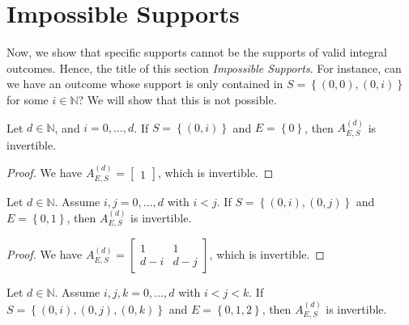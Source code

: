 \section{Impossible Supports}\label{sec:impossible-supports}

Now, we show that specific supports cannot be the supports of valid integral outcomes. Hence, the title of this section \emph{Impossible Supports}. For instance, can we have an outcome whose support is only contained in \( S = \left\{ (0,0), (0,i) \right\} \) for some \( i \in \mathbb{N} \)? We will show that this is not possible.



\begin{proposition}\label{prop:impossible-support-23233243243423}
    Let \( d \in \mathbb{N} \), and \( i=0, \dots, d \). If \( S = \left\{ (0,i) \right\} \) and \( E = \left\{ 0 \right\} \), then \( A^{(d)}_{E,S} \) is invertible.
\end{proposition}

\begin{proof}
    We have \( A^{(d)}_{E,S} = \begin{bmatrix}
        1
    \end{bmatrix} \), which is invertible.
\end{proof}

\begin{proposition}\label{prop:impossible-support-232423}
    Let \( d \in \mathbb{N} \). Assume \( i,j=0, \dots, d \) with \( i < j \). If \( S = \left\{ (0,i), (0,j) \right\} \) and \( E = \left\{ 0,1 \right\} \), then \( A^{(d)}_{E,S} \) is invertible.
\end{proposition}

\begin{proof}
    We have \( A^{(d)}_{E,S} = \begin{bmatrix}
        1 & 1 \\ d-i & d-j
    \end{bmatrix} \), which is invertible.
\end{proof}

\begin{proposition}\label{prop:impossible-support-2}
    Let \( d \in \mathbb{N} \). Assume \( i,j,k=0, \dots, d \) with \( i < j < k \). If \( S = \left\{ (0,i), (0,j), (0,k) \right\} \) and \( E = \left\{ 0,1,2 \right\} \), then \( A^{(d)}_{E,S} \) is invertible.
\end{proposition}

